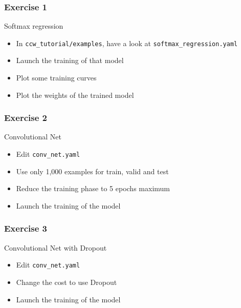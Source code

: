 \documentclass[mathserif, xcolor=dvipsnames]{beamer}
\begin{document}
\begin{frame}
    \frametitle{Exercise 1}
    \LARGE Softmax regression
    \begin{itemize}\addtolength{\itemsep}{0.5\baselineskip}
            \large
            \item{In \texttt{ccw\_tutorial/examples}, have a look at
                  \texttt{softmax\_regression.yaml}}
            \item{Launch the training of that model}
            \item{Plot some training curves}
            \item{Plot the weights of the trained model}
    \end{itemize}
\end{frame}

\begin{frame}
    \frametitle{Exercise 2}
    \LARGE Convolutional Net
    \begin{itemize}\addtolength{\itemsep}{0.5\baselineskip}
            \large
            \item{Edit \texttt{conv\_net.yaml}}
            \item{Use only 1,000 examples for train, valid and test}
            \item{Reduce the training phase to 5 epochs maximum}
            \item{Launch the training of the model}
    \end{itemize}
\end{frame}

\begin{frame}
    \frametitle{Exercise 3}
    \LARGE Convolutional Net with Dropout
    \begin{itemize}\addtolength{\itemsep}{0.5\baselineskip}
            \large
            \item{Edit \texttt{conv\_net.yaml}}
            \item{Change the cost to use Dropout}
            \item{Launch the training of the model}
    \end{itemize}
\end{frame}
\end{document}
